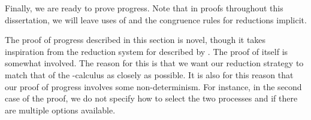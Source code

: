 Finally, we are ready to prove progress.
Note that in proofs throughout this dissertation, we will leave uses of
\cpRedGammaEquiv and the congruence rules for reductions implicit. 

The proof of progress described in this section is novel, though it takes
inspiration from the reduction system for \cp described by . 
The proof of itself is somewhat involved. The reason for
this is that we want our reduction strategy to match that of the
\textpi-calculus as closely as possible.
It is also for this reason that our proof of progress involves some
non-determinism. For instance, in the second case of the proof, we do not
specify how to select the two processes  and  if there are
multiple options available.

